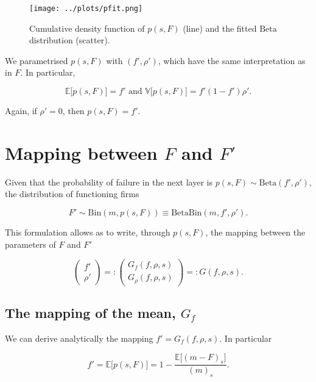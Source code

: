 \documentclass[american, abstract=on]{scrartcl}
\newcommand{\E}{\mathbb{E}}
\newcommand{\V}{\mathbb{V}}
\newcommand{\Beta}{\text{Beta}}
\newcommand{\Bin}{\text{Bin}}
\begin{document}
\begin{figure}[H]
    \centering
    \texttt{[image: ../plots/pfit.png]}
    \caption{Cumulative density function of $p(s, F)$ (line) and the fitted $\Beta$ distribution (scatter).}
    \label{fig:pfit}
\end{figure}

We parametrised $p(s, F)$ with $(f', \rho')$, which have the same interpretation as in $F$. In particular,

\begin{equation}
    \E\big[p(s, F)\big] = f' \text{ and } \V\big[p(s, F)\big] = f' (1 - f')\rho'.
\end{equation}

Again, if $\rho' = 0$, then $p(s, F) = f'$.

\section{Mapping between $F$ and $F'$}

Given that the probability of failure in the next layer is $p(s, F) \sim \Beta(f', \rho')$, the distribution of functioning firms 

\begin{equation}
    F' \sim \Bin(m, p(s, F)) \equiv \Beta\Bin(m, f', \rho').
\end{equation}

This formulation allows as to write, through $p(s, F)$, the mapping between the parameters of $F$ and $F'$

\begin{equation}
    \begin{pmatrix}
        f' \\ \rho'
    \end{pmatrix} =: \begin{pmatrix}
        G_f(f, \rho, s) \\ G_\rho(f, \rho, s)
    \end{pmatrix} =: G(f, \rho, s).
\end{equation}

\subsection{The mapping of the mean, $G_f$}

We can derive analytically the mapping $f' = G_f(f, \rho, s)$. In particular

\begin{equation}
    f' = \E\big[p(s, F)\big] = 1 - \frac{\E\big[(m - F)_s\big]}{(m)_s}.
\end{equation}
\end{document}

